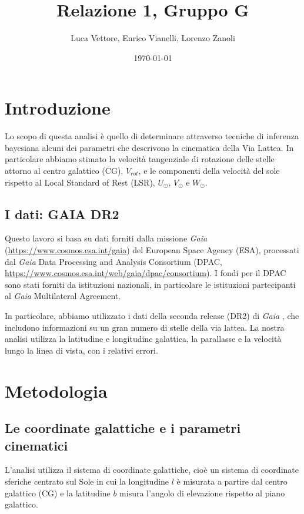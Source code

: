 \documentclass[twocolumn]{article}
\title{Relazione 1, Gruppo G}
\author{
Luca Vettore, Enrico Vianelli, Lorenzo Zanoli
}
\date{\today}
\begin{document}
\maketitle

\section{Introduzione}
Lo scopo di questa analisi è quello di determinare attraverso tecniche di inferenza bayesiana alcuni dei parametri che descrivono la cinematica della Via Lattea. In particolare abbiamo stimato la velocità tangenziale di rotazione delle stelle attorno al centro galattico (CG), $V_{rot}$, e le componenti della velocità del sole rispetto al Local Standard of Rest (LSR), $U_\odot$, $V_\odot$ e $W_\odot$.


\subsection{I dati: GAIA DR2}

Questo lavoro si basa su dati forniti dalla missione {\it Gaia} \cite{GaiaMission2016} (\url{https://www.cosmos.esa.int/gaia}) del European Space Agency (ESA), processati dal {\it Gaia} Data Processing and Analysis Consortium (DPAC, \url{https://www.cosmos.esa.int/web/gaia/dpac/consortium}). I fondi per il DPAC sono stati forniti da istituzioni nazionali, in particolare le istituzioni partecipanti al {\it Gaia} Multilateral Agreement.

In particolare, abbiamo utilizzato i dati della seconda release (DR2) di {\it Gaia} \cite{GaiaDR2}, che includono informazioni su un gran numero di stelle della via lattea. La nostra analisi utilizza la latitudine e longitudine galattica, la parallasse e la velocità lungo la linea di vista, con i relativi errori.


\section{Metodologia}

\subsection{Le coordinate galattiche e i parametri cinematici}
L'analisi utilizza il sistema di coordinate galattiche, cioè un sistema di coordinate sferiche centrato sul Sole in cui la longitudine $l$ è misurata a partire dal centro galattico (CG) e la latitudine $b$ misura l'angolo di elevazione rispetto al piano galattico.
\end{document}
